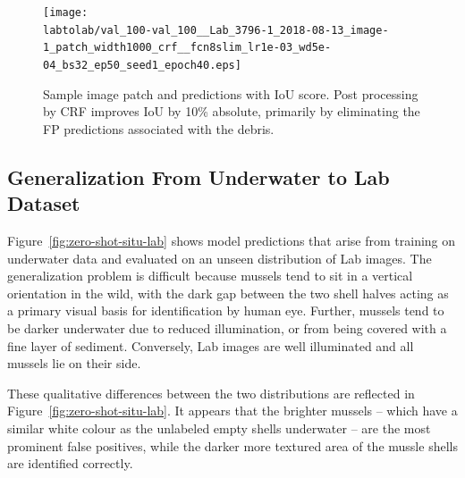\documentclass[11pt]{article} %
\begin{document}
\begin{figure}
\centering
\texttt{[image: \\labtolab/val\_100-val\_100\_\_Lab\_3796-1\_2018-08-13\_image-1\_patch\_width1000\_crf\_\_fcn8slim\_lr1e-03\_wd5e-04\_bs32\_ep50\_seed1\_epoch40.eps]}
\caption{Sample image patch and predictions with IoU score. Post processing 
by CRF improves IoU by 10\% absolute, primarily by eliminating the FP
predictions associated with the debris.}
\label{fig:lab-to-lab-sample}
\end{figure}


\subsection{Generalization From Underwater to Lab Dataset}

Figure~\ref{fig:zero-shot-situ-lab} shows model predictions that arise from
training on underwater data and evaluated on an unseen distribution of Lab
images. The generalization problem is difficult because mussels tend to sit in a
vertical orientation in the wild, with the dark gap between the two shell
halves acting as a primary visual basis for identification by human eye. 
Further, mussels tend to be darker underwater due to reduced illumination, or
from being covered with a fine layer of sediment. Conversely, Lab images are 
well illuminated and all mussels lie on their side. 

These qualitative differences between the two distributions are 
reflected in Figure~\ref{fig:zero-shot-situ-lab}. It appears that the brighter 
mussels -- which have a similar white colour as the unlabeled empty shells
underwater -- are the most prominent false positives, while the darker more 
textured area of the mussle shells are identified correctly.

\newcommand{\zshot}{./img/situ_to_lab/}
\end{document}
